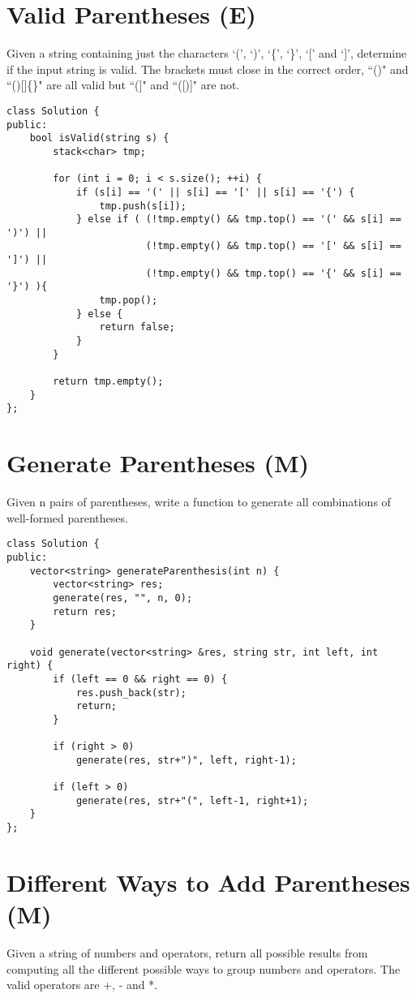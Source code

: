 \section{Valid Parentheses (E)}
Given a string containing just the characters `(', `)', `\{', `\}', `[' and `]', determine if the input string is valid. The brackets must close in the correct order, ``()" and ``()[]\{\}" are all valid but ``(]" and ``([)]" are not.\\

\begin{lstlisting}
class Solution {
public:
    bool isValid(string s) {
        stack<char> tmp;
        
        for (int i = 0; i < s.size(); ++i) {
            if (s[i] == '(' || s[i] == '[' || s[i] == '{') {
                tmp.push(s[i]);
            } else if ( (!tmp.empty() && tmp.top() == '(' && s[i] == ')') ||
                        (!tmp.empty() && tmp.top() == '[' && s[i] == ']') ||                                               
                        (!tmp.empty() && tmp.top() == '{' && s[i] == '}') ){
                tmp.pop();
            } else {
                return false;
            }
        }
        
        return tmp.empty();
    }
};
\end{lstlisting}


\section{Generate Parentheses (M)}
Given n pairs of parentheses, write a function to generate all combinations of well-formed parentheses. \\
 
\begin{lstlisting}
class Solution {
public:
    vector<string> generateParenthesis(int n) {
        vector<string> res;
        generate(res, "", n, 0);
        return res;
    }
    
    void generate(vector<string> &res, string str, int left, int right) {
        if (left == 0 && right == 0) {
            res.push_back(str);
            return;
        }
            
        if (right > 0)
            generate(res, str+")", left, right-1);
            
        if (left > 0)
            generate(res, str+"(", left-1, right+1);
    }
};
\end{lstlisting}


\section{Different Ways to Add Parentheses (M)}
Given a string of numbers and operators, return all possible results from computing all the different possible ways to group numbers and operators. The valid operators are +, - and *.\\

